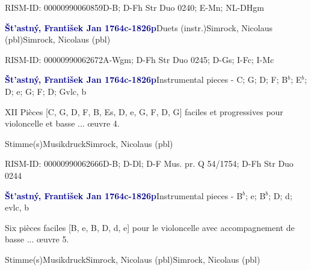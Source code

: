 \documentclass[twocolumn, 12pt]{book}
\begin{document}
\par RISM-ID: 00000990060859\newline D-B; D-Fh  Str Duo 0240; E-Mn; NL-DHgm
\par \vspace{16pt} \textcolor{darkblue}{\textbf{Št'astný, František Jan  1764c-1826p}}\hfillplus{\textbf{[331]}}\newline Duets (instr.)\newline Simrock, Nicolaus  (pbl)\newline Simrock, Nicolaus  (pbl)
\par RISM-ID: 00000990062672\newline A-Wgm; D-Fh  Str Duo 0245; D-Gs; I-Fc; I-Mc
\par \vspace{16pt} \textcolor{darkblue}{\textbf{Št'astný, František Jan  1764c-1826p}}\hfillplus{\textbf{[332]}}\newline Instrumental pieces - C; G; D; F; B$^b$; E$^b$; D; e; G; F; D; G\newline vlc, b
\par \begin{itshape}XII Pièces [C, G, D, F, B, Es, D, e, G, F, D, G] faciles et progressives pour violoncelle et basse ... œuvre 4.\end{itshape} 
\par \textcolor{darkblue}{}  Stimme(s)\newline Musikdruck\newline Simrock, Nicolaus  (pbl)
\par RISM-ID: 00000990062666\newline D-B; D-Dl; D-F  Mus. pr. Q 54/1754; D-Fh  Str Duo 0244
\par \vspace{16pt} \textcolor{darkblue}{\textbf{Št'astný, František Jan  1764c-1826p}}\hfillplus{\textbf{[333]}}\newline Instrumental pieces - B$^b$; e; B$^b$; D; d; e\newline vlc, b
\par \begin{itshape}Six pièces faciles [B, e, B, D, d, e] pour le violoncelle avec accompagnement de basse ... œuvre 5.\end{itshape} 
\par \textcolor{darkblue}{}  Stimme(s)\newline Musikdruck\newline Simrock, Nicolaus  (pbl)\newline Simrock, Nicolaus  (pbl)
\end{document}
